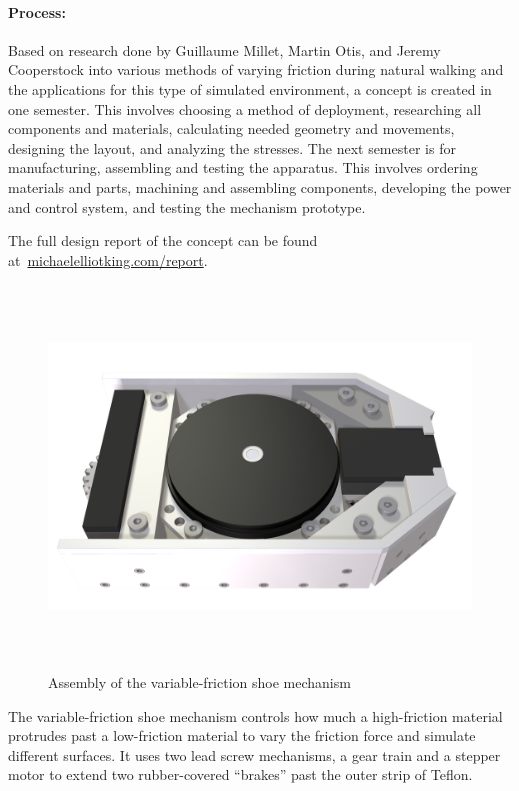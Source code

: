 \documentclass[12pt, landscape]{article}
\begin{document}
\paragraph{Process:}  Based on research done by Guillaume Millet, Martin Otis, and Jeremy Cooperstock into various methods of varying friction during natural walking and the applications for this type of simulated environment, a concept is created in one semester.  This involves choosing a method of deployment, researching all components and materials, calculating needed geometry and movements, designing the layout, and analyzing the stresses.  The next semester is for manufacturing, assembling and testing the apparatus. This involves ordering materials and parts, machining and assembling components, developing the power and control system, and testing the mechanism prototype.  

The full design report of the concept can be found at~\href{http://michaelelliotking.com/report}{michaelelliotking.com/report}.

\begin{figure}[H]
\centering
\includegraphics[height=4in]{media/side_overview.png}
\caption{Assembly of the variable-friction shoe mechanism}
\label{overview}
\end{figure}

The variable-friction shoe mechanism controls how much a high-friction material protrudes past a low-friction material to vary the friction force and simulate different surfaces. It uses two lead screw mechanisms, a gear train and a stepper motor to extend two rubber-covered ``brakes'' past the outer strip of Teflon.
\end{document}

